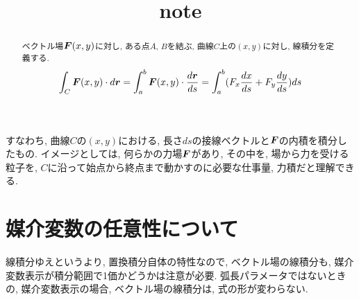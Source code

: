 \documentclass{jsarticle} \usepackage[dvipdfmx]{graphicx} \usepackage[dvipdfmx]{hyperref}
\title{note}
\newcommand*{\mbold}[1]{\mbox{\boldmath $#1$}}
\begin{document}
\maketitle

\begin{abstract}
  ベクトル場$\mbold{F}(x, y)$に対し, ある点$A$, $B$を結ぶ, 曲線$C$上の$(x, y)$に対し, 線積分を定義する. 
  \begin{equation}
    \int_C \mbold{F}(x, y)\cdot d\mbold{r}
    = \int_a^b \mbold{F}(x, y) \cdot \frac{d\mbold{r}}{ds}
    = \int_a^b (F_x \frac{dx}{ds} + F_y \frac{dy}{ds})ds
  \end{equation}
\end{abstract}
すなわち, 曲線$C$の$(x, y)$における, 長さ$ds$の接線ベクトルと$\mbold{F}$の内積を積分したもの. イメージとしては, 何らかの力場$\mbold{F}$があり, その中を, 場から力を受ける粒子を, $C$に沿って始点から終点まで動かすのに必要な仕事量, 力積だと理解できる. 
\section*{媒介変数の任意性について}
線積分ゆえというより, 置換積分自体の特性なので, ベクトル場の線積分も, 媒介変数表示が積分範囲で1価かどうかは注意が必要. 
弧長パラメータではないときの, 媒介変数表示の場合, ベクトル場の線積分は, 式の形が変わらない. 
\end{document}
